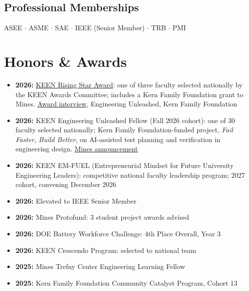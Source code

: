 \documentclass[11pt,letterpaper]{article}
\begin{document}
\subsection{Professional Memberships}

\noindent ASEE $\cdot$ ASME $\cdot$ SAE $\cdot$ IEEE (Senior Member) $\cdot$ TRB $\cdot$ PMI

\section{Honors \& Awards}

\begin{itemize}[noitemsep]
  \item \textbf{2026:} \href{https://engineeringunleashed.com/rising-stars}{KEEN Rising
        Star Award}: one of three faculty selected nationally
        by the KEEN Awards Committee; includes a Kern Family Foundation grant to Mines.
        \href{https://engineeringunleashed.com/keen-rising-star-adam-duran}{Award interview},
        Engineering Unleashed, Kern Family Foundation
  \item \textbf{2026:} KEEN Engineering Unleashed Fellow (Fall 2026 cohort): one of 30
        faculty selected nationally; Kern Family Foundation-funded project, \textit{Fail Faster,
        Build Better}, on AI-assisted test planning and verification in engineering design.
        \href{https://www.mines.edu/news/all-news/2026/three-mines-professors-named-2026-engineering-unleashed-fellows.html}{Mines announcement}
  \item \textbf{2026:} KEEN EM-FUEL (Entrepreneurial Mindset for Future University
        Engineering Leaders): competitive national faculty leadership program;
        2027 cohort, convening December 2026
  \item \textbf{2026:} Elevated to IEEE Senior Member
  \item \textbf{2026:} Mines Protofund: 3 student project awards advised
  \item \textbf{2026:} DOE Battery Workforce Challenge: 4th Place Overall, Year 3
  \item \textbf{2026:} KEEN Crescendo Program: selected to national team
  \item \textbf{2025:} Mines Trefny Center Engineering Learning Fellow
  \item \textbf{2025:} Kern Family Foundation Community Catalyst Program, Cohort 13

\end{itemize}
\end{document}
